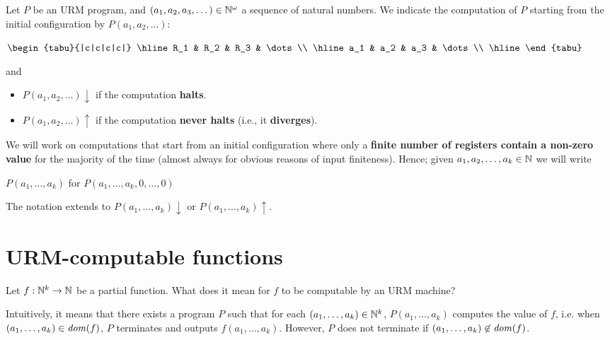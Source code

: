 \begin{notation}
  Let $P$ be an URM program, and $(a_1,a_2,a_3,\dots) \in \mathbb{N}^\omega$ a sequence
  of natural numbers. We indicate the computation of $P$ starting from the
  initial configuration by $P(a_1,a_2,\dots)$:

  \begin{center}
    $\begin{tabu}{|c|c|c|c|}
      \hline
      R_1 & R_2 & R_3 & \dots \\
      \hline
      a_1 & a_2 & a_3 & \dots \\
      \hline
    \end{tabu}$
  \end{center}

  and

  \begin{itemize}
  \item $P(a_1,a_2,\dots) \downarrow$ if the computation \textbf{halts}.
  \item $P(a_1,a_2,\dots) \uparrow$ if the computation \textbf{never
      halts} (i.e., it \textbf{diverges}).
  \end{itemize}


  We will work on computations that start from an initial configuration
  where only a \textbf{finite number of registers contain a non-zero value} for
  the majority of the time (almost always for obvious reasons of input
  finiteness). Hence; given $a_1,a_2,\dots,a_k \in \mathbb{N}$ we will write

  \begin{center}
    $P(a_1,\dots,a_k)$ for 
    $P(a_1,\dots,a_k,0,\dots,0)$
  \end{center}

  The notation extends to $P(a_1,\dots,a_k)\downarrow$ or
  $P(a_1,\dots,a_k)\uparrow$.
\end{notation}

\section{URM-computable functions}

Let $f : \mathbb{N}^k \rightarrow \mathbb{N}$ be a partial function. What does it mean for  $f$ to be computable by an URM machine?

Intuitively, it means that there exists a program $P$ such that for each $(a_1,\dots,a_k) \in \mathbb{N}^k$, 
$P(a_1,\dots,a_k)$ computes the value of $f$, i.e. when $(a_1,\dots,a_k) \in \mathit{dom}({f})$, 
$P$ terminates and outputs $f(a_1, \ldots, a_k)$. 
However, $P$ does not terminate if $(a_1,\dots,a_k) \not\in \mathit{dom}({f})$.

